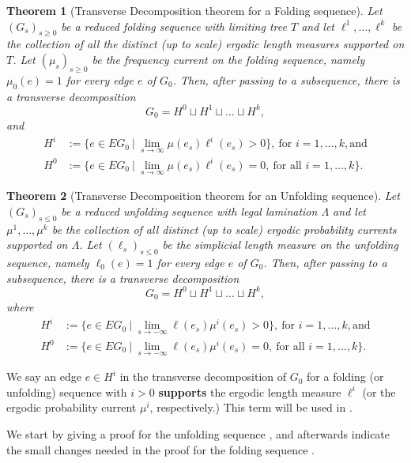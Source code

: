 \documentclass[11pt, letterpaper]{amsart}
\theoremstyle{plain}
\newtheorem{theorem}{Theorem}[section]
\theoremstyle{definition}
\begin{document}
\begin{theorem}[Transverse Decomposition theorem for a Folding sequence] \label{thm:NPRdecomp-folding}
  Let $(G_s)_{s \ge 0}$ be a reduced folding sequence with limiting tree 
  $T$ and let $\ell^1, \ldots, \ell^k$ be the collection of all the distinct (up to scale) ergodic length measures supported on $T$. 
  Let $(\mu_s)_{s \ge 0}$ be the \emph{frequency current} on the folding
  sequence, namely $\mu_0(e)=1$ for every edge $e$ of $G_0$. Then, after passing
  to a subsequence, there is a transverse decomposition
  \[
    G_0 = H^0 \sqcup H^1 \sqcup \ldots \sqcup H^k,
  \]
  and 
  \begin{align*}
    H^i &:= \{e \in EG_0\ |\ \lim_{s \to \infty}\mu(e_s)\ell^i(e_s)>0\},\  \text{for $i=1,\ldots,k$}, \text{and}\\
    H^0 &:= \{e \in EG_0\ |\ \lim_{s \to \infty}\mu(e_s)\ell^i(e_s)=0,\ \text{for
          all $i=1,\ldots,k$}\}.
  \end{align*}
\end{theorem}

\begin{theorem}[Transverse Decomposition theorem for an Unfolding sequence] \label{thm:NPRdecomp-unfolding}
  Let $(G_s)_{s \le 0}$ be a reduced unfolding sequence with legal lamination
  $\Lambda$ and let $\mu^1,\ldots,\mu^k$ be the collection of all distinct (up to scale) ergodic probability currents supported on $\Lambda$. Let
  $(\ell_s)_{s \le 0}$ be the \emph{simplicial length measure} on the unfolding
  sequence, namely $\ell_0(e)=1$ for every edge $e$ of $G_0$. Then, after passing
  to a subsequence, there is a transverse decomposition
  \[
    G_0 = H^0 \sqcup H^1 \sqcup \ldots \sqcup H^k,
  \]
  where
  \begin{align*}
    H^i &:= \{e \in EG_0\ |\ \lim_{s \to -\infty}\ell(e_s)\mu^i(e_s)>0\}, \ \text{for $i=1,\ldots,k$}, \text{and} \\
    H^0 &:= \{e \in EG_0\ |\ \lim_{s \to -\infty}\ell(e_s)\mu^i(e_s)=0,\ \text{for
          all $i=1,\ldots,k$}\}.
  \end{align*}
\end{theorem}

We say an edge $e \in H^i$ in the transverse decomposition of $G_0$ for a folding (or unfolding) sequence with $i>0$ \textbf{supports} the ergodic length measure $\ell^i$ (or the ergodic probability current $\mu^i$, respectively.) This term will be used in .

We start by giving a proof for the unfolding sequence , and
afterwards indicate the small changes needed in the proof for the folding sequence .
\end{document}
